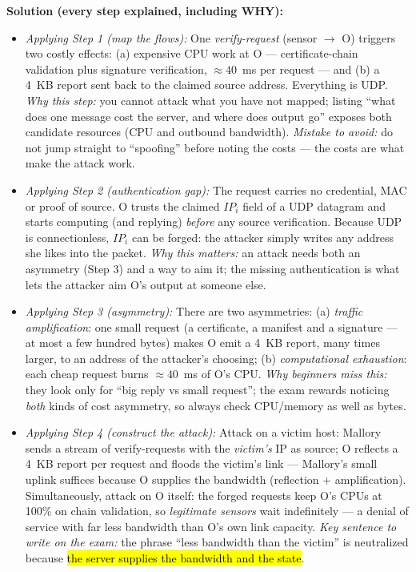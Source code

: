 \documentclass[12pt, a4paper]{article}
\newcommand{\imp}[1]{\hl{#1}}                       %
\begin{document}
\textbf{Solution (every step explained, including WHY):}
\begin{itemize}
    \item \textit{Applying Step 1 (map the flows):} One \emph{verify-request} (sensor $\rightarrow$ O) triggers two costly effects: (a) expensive CPU work at O --- certificate-chain validation plus signature verification, $\approx 40$~ms per request --- and (b) a 4~KB report sent back to the claimed source address. Everything is UDP. \emph{Why this step:} you cannot attack what you have not mapped; listing ``what does one message cost the server, and where does output go'' exposes both candidate resources (CPU and outbound bandwidth). \emph{Mistake to avoid:} do not jump straight to ``spoofing'' before noting the costs --- the costs are what make the attack work.
    \item \textit{Applying Step 2 (authentication gap):} The request carries no credential, MAC or proof of source. O trusts the claimed $IP_i$ field of a UDP datagram and starts computing (and replying) \emph{before} any source verification. Because UDP is connectionless, $IP_i$ can be forged: the attacker simply writes any address she likes into the packet. \emph{Why this matters:} an attack needs both an asymmetry (Step 3) and a way to aim it; the missing authentication is what lets the attacker aim O's output at someone else.
    \item \textit{Applying Step 3 (asymmetry):} There are two asymmetries: (a) \emph{traffic amplification}: one small request (a certificate, a manifest and a signature --- at most a few hundred bytes) makes O emit a 4~KB report, many times larger, to an address of the attacker's choosing; (b) \emph{computational exhaustion}: each cheap request burns $\approx 40$~ms of O's CPU. \emph{Why beginners miss this:} they look only for ``big reply vs small request''; the exam rewards noticing \emph{both} kinds of cost asymmetry, so always check CPU/memory as well as bytes.
    \item \textit{Applying Step 4 (construct the attack):} Attack on a victim host: Mallory sends a stream of verify-requests with the \emph{victim's} IP as source; O reflects a 4~KB report per request and floods the victim's link --- Mallory's small uplink suffices because O supplies the bandwidth (reflection $+$ amplification). Simultaneously, attack on O itself: the forged requests keep O's CPUs at 100\% on chain validation, so \emph{legitimate sensors} wait indefinitely --- a denial of service with far less bandwidth than O's own link capacity. \emph{Key sentence to write on the exam:} the phrase ``less bandwidth than the victim'' is neutralized because \imp{the server supplies the bandwidth and the state}.

\end{itemize}
\end{document}
